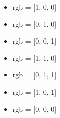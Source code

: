 \documentclass[a4paper,12pt]{article}
\begin{document}
\large

\begin{itemize}
    \item \textcolor{color1}{rgb = [1, 0, 0]}
    \item \textcolor{color2}{rgb = [0, 1, 0]}
    \item \textcolor{color3}{rgb = [0, 0, 1]}
    \item \textcolor{color4}{rgb = [1, 1, 0]}
    \item \textcolor{color5}{rgb = [0, 1, 1]}
    \item \textcolor{color6}{rgb = [1, 0, 1]}
    \item \textcolor{color7}{rgb = [0, 0, 0]}
\end{itemize}
    
\end{document}
